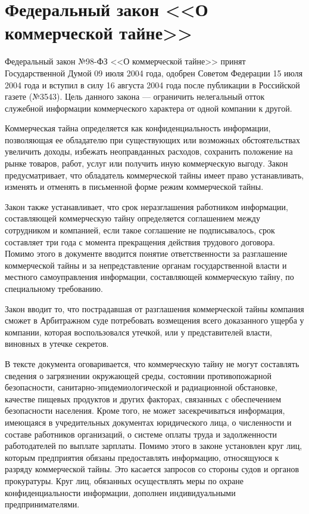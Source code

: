 \section{Федеральный закон <<О коммерческой тайне>>} \label{rights_98}

Федеральный закон №98-ФЗ <<О коммерческой тайне>> принят Государственной Думой 09 июля 2004 года, одобрен Советом Федерации 15 июля 2004 года и вступил в силу 16 августа 2004 года после публикации в Российской газете (№3543).
Цель данного закона --- ограничить нелегальный отток служебной информации коммерческого характера от одной компании к другой.

\vspace{\baselineskip}
Коммерческая тайна определяется как конфиденциальность информации, позволяющая ее обладателю при существующих или возможных обстоятельствах увеличить доходы, избежать неоправданных расходов, сохранить положение на рынке товаров, работ, услуг или получить иную коммерческую выгоду.
Закон предусматривает, что обладатель коммерческой тайны имеет право устанавливать, изменять и отменять в письменной форме режим коммерческой тайны.

Закон также устанавливает, что срок неразглашения работником информации, составляющей коммерческую тайну определяется соглашением между сотрудником и компанией, если такое соглашение не подписывалось, срок составляет три года с момента прекращения действия трудового договора. Помимо этого в документе вводится понятие ответственности за разглашение коммерческой тайны и за непредставление органам государственной власти и местного самоуправления информации, составляющей коммерческую тайну, по специальному требованию.

\vspace{\baselineskip}
Закон вводит то, что пострадавшая от разглашения коммерческой тайны компания сможет в Арбитражном суде потребовать возмещения всего доказанного ущерба у компании, которая воспользовался утечкой, или у представителей власти, виновных в утечке секретов.

\vspace{\baselineskip}
В тексте документа оговаривается, что коммерческую тайну не могут составлять сведения о загрязнении окружающей среды, состоянии противопожарной безопасности, санитарно-эпидемиологической и радиационной обстановке, качестве пищевых продуктов и других факторах, связанных с обеспечением безопасности населения. Кроме того, не может засекречиваться информация, имеющаяся в учредительных документах юридического лица, о численности и составе работников организаций, о системе оплаты труда и задолженности работодателей по выплате зарплаты. Помимо этого в законе установлен круг лиц, которым предприятия обязаны предоставлять информацию, относящуюся к разряду коммерческой тайны. Это касается запросов со стороны судов и органов прокуратуры. Круг лиц, обязанных осуществлять меры по охране конфиденциальности информации, дополнен индивидуальными предпринимателями.

